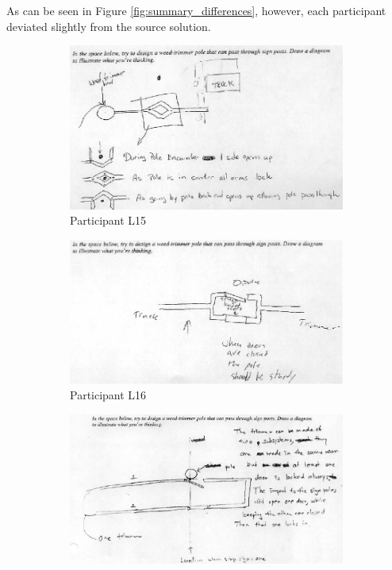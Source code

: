 \documentclass[12pt]{article}
\begin{document}
As can be seen in Figure \ref{fig:summary_differences}, however, each participant deviated slightly from the source solution. 



\begin{figure}[h!]
  \centering
  \begin{subfigure}[b]{0.45\linewidth}
    \includegraphics[width=\linewidth]{images/drawing_l15_con2.PNG}
     \caption{Participant L15}
  \end{subfigure}
  \begin{subfigure}[b]{0.45\linewidth}
    \includegraphics[width=\linewidth]{images/drawing_l16_con1.PNG}
    \caption{Participant L16}
  \end{subfigure}
  \begin{subfigure}[b]{0.45\linewidth}
    \includegraphics[width=\linewidth]{images/drawing_l22_con2.PNG}

\end{subfigure}
\end{figure}
\end{document}

